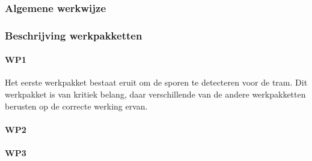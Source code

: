 \documentclass[]{book}
\begin{document}
\subsubsection{Algemene werkwijze}


\subsubsection{Beschrijving werkpakketten}



\paragraph{WP1}

Het eerste werkpakket bestaat eruit om de sporen te detecteren voor de tram. Dit werkpakket is van kritiek belang, daar verschillende van de andere werkpakketten berusten op de correcte werking ervan.

\paragraph{WP2}

\paragraph{WP3}
\end{document}
